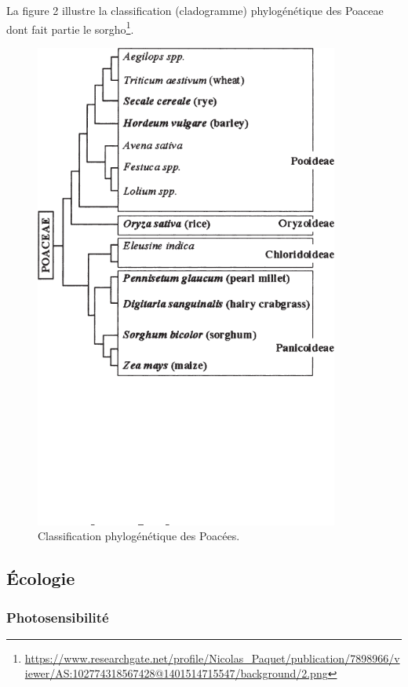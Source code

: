 \documentclass[a4paper,11pt]{article}
\begin{document}
La figure 2 illustre la classification (cladogramme) phylogénétique
des Poaceae dont fait partie le sorgho\footnote{\url{https://www.researchgate.net/profile/Nicolas_Paquet/publication/7898966/viewer/AS:102774318567428@1401514715547/background/2.png}}.



\begin{figure}%
  \begin{center}
    \includegraphics[width=10cm]{images/PoaceaePhylogeny}
  \end{center}
\caption{Classification phylogénétique des Poacées.}
\end{figure}


\subsection{Écologie}

\subsubsection{Photosensibilité}
\end{document}
